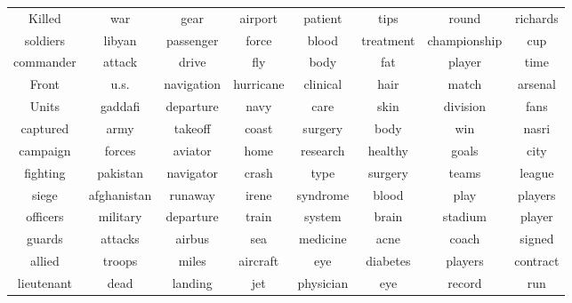 \documentclass[conference,compsoc]{IEEEtran}
\begin{document}
\begin{table}[ht]
\begin{tabular}{|cc|cc|cc|cc|}
Killed & war & gear & airport & patient & tips & round & richards \\ 
soldiers & libyan & passenger & force & blood & treatment & championship & cup \\ 
commander & attack & drive & fly & body & fat & player & time \\ 
Front & u.s. & navigation & hurricane & clinical & hair & match & arsenal \\ 
Units & gaddafi & departure & navy & care & skin & division & fans \\ 
captured & army & takeoff & coast & surgery & body & win & nasri \\ 
campaign & forces & aviator & home & research & healthy & goals & city \\ 
fighting & pakistan & navigator & crash & type & surgery & teams & league \\ 
siege & afghanistan & runaway & irene & syndrome & blood & play & players \\ 
officers & military & departure & train & system & brain & stadium & player \\ 
guards & attacks & airbus & sea & medicine & acne & coach & signed \\ 
allied & troops & miles & aircraft & eye & diabetes & players & contract \\ 
lieutenant & dead & landing & jet & physician & eye & record & run \\ \hline
\end{tabular}
\end{table}
\end{document}
